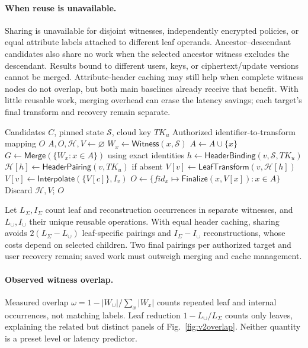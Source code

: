 \documentclass[runningheads]{llncs}
\newif\ifmarkrevisions
\newenvironment{revision}{\par\begingroup\ifmarkrevisions\color{RevisionBlue}\fi}{\par\endgroup}
\newcommand{\PolicyState}{\mathcal S}
\newcommand{\Witness}{\mathsf{Witness}}
\begin{document}
\begin{revision}
\paragraph{When reuse is unavailable.}
Sharing is unavailable for disjoint witnesses, independently encrypted
policies, or equal attribute labels attached to different leaf operands.
Ancestor--descendant candidates also share no work when the selected
ancestor witness excludes the descendant. Results bound to different users,
keys, or ciphertext/update versions cannot be merged. Attribute-header
caching may still help when complete witness nodes do not overlap, but
both main baselines already receive that benefit. With little reusable
work, merging overhead can erase the latency savings; each target's final
transform and recovery remain separate.
\begin{algorithm}[!htbp]
\ifmarkrevisions\color{RevisionBlue}\fi
\caption{Shared-witness authorization for one query}
\label{alg:shared}
\begin{algorithmic}[1]
\Require Candidates $C$, pinned state $\PolicyState$, cloud key $TK_u$
\Ensure Authorized identifier-to-transform mapping $O$
\State $A,O,\mathcal H,V\gets\varnothing$
  \State $W_x\gets\Witness(x,\PolicyState)$
   \State $A\gets A\cup\{x\}$ \EndIf
\EndFor
\State $G\gets\mathsf{Merge}(\{W_x:x\in A\})$ using exact identities
    \State $h\gets\mathsf{HeaderBinding}(v,\PolicyState,TK_u)$
    \State $\mathcal H[h]\gets\mathsf{HeaderPairing}(v,TK_u)$ if absent
    \State $V[v]\gets\mathsf{LeafTransform}(v,\mathcal H[h])$
  \Else \State $V[v]\gets\mathsf{Interpolate}(\{V[c]\},I_v)$ \EndIf
\EndFor
\State $O\gets\{fid_x\mapsto\mathsf{Finalize}(x,V[x]):x\in A\}$
\State Discard $\mathcal H,V$; \Return $O$
\end{algorithmic}
\end{algorithm}

Let $L_\Sigma,I_\Sigma$ count leaf and reconstruction occurrences in separate
witnesses, and $L_\cup,I_\cup$ their unique reusable operations. With equal
header caching, sharing avoids $2(L_\Sigma-L_\cup)$ leaf-specific pairings
and $I_\Sigma-I_\cup$ reconstructions, whose costs depend on selected children.
Two final pairings per authorized target and user recovery remain; saved work
must outweigh merging and cache management.

\paragraph{Observed witness overlap.}
Measured overlap $\omega=1-|W_\cup|/\sum_x|W_x|$ counts repeated leaf and
internal occurrences, not matching labels. Leaf reduction $1-L_\cup/L_\Sigma$
counts only leaves, explaining the related but distinct panels of
Fig.~\ref{fig:v2overlap}. Neither quantity is a preset level or latency predictor.
\end{revision}
\end{document}

